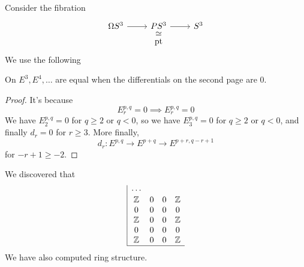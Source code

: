 \documentclass{article}
\newcommand{\Z}{\mathbb{Z}}
\DeclareMathOperator{\pt}{pt}
\begin{document}
\begin{example}
	Consider the fibration
	\[\begin{tikzcd}[row sep=tiny]
		\Omega S^3\arrow[r]&PS^3\arrow[r]&S^3\\
		&\pt\arrow[u,phantom,"\simeq"]
	\end{tikzcd}\]
	We use the following
	\begin{claim}
		On $E^3,E^4,\ldots$ are equal when the differentials on the second page are 0.
	\end{claim}
	\begin{proof}
		It's because
		\[E_r^{p,q}=0\implies E_r^{p,q}=0\]
		We have $E_2^{p,q}=0$ for $q\geq2$ or $q<0$, so we have $E_3^{p,q}=0$ for $q\geq2$ or $q<0$, and finally $d_r=0$ for $r\geq3$. More finally,
		\[d_r:E^{p,q}\to E^{p+q}\to E^{p+r,q-r+1}\]
		for $-r+1\geq-2$.
	\end{proof}
	We discovered that
	\begin{align*}
		\begin{array}{|cccc}
			\cdots&&&\\
			\Z&0&0&\Z\\
			0&0&0&0\\
			\Z&0&0&\Z\\
			0&0&0&0\\
			\Z&0&0&\Z\\
			\hline
		\end{array}
	\end{align*}
	We have also computed ring structure.
\end{example}
\end{document}
